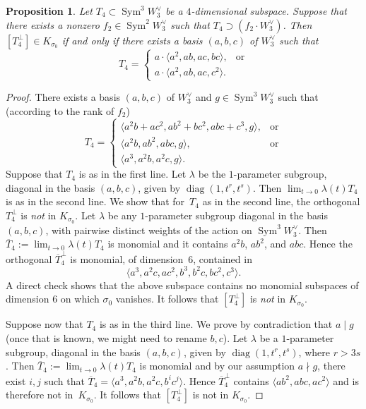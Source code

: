 \documentclass[JEP,XML,SOM,Unicode, NoEqCountersInSection,NoFloatCountersInSection]{cedram}
\newtheorem{prop}[lemm]{Proposition}
\theoremstyle{definition}
\let\la\langle
\let\ra\rangle
\let\ov\overline
\DeclareMathOperator{\Sym}{Sym}
\DeclareMathOperator{\diag}{diag}
\begin{document}
\begin{prop}\label{gary}
Let $T_4\subset \Sym^3 \!W^{\vee}_3$ be a $4$-dimensional subspace. Suppose that there exists a nonzero $f_2\in\Sym^2\! W_3^{\vee}$ such that $T_4\supset (f_2\cdot W_3^{\vee})$. Then $[T_4^{\bot}]\in K_{\sigma_0}$ if and only if there exists a basis $(a,b,c)$ of $W^{\vee}_3$ such that
\begin{equation}
T_4=
\begin{cases}
a\cdot\la a^2, ab,ac,bc\ra,& \text{or}\\
a\cdot\la a^2,ab,ac,c^2\ra.
\end{cases}
\end{equation}
\end{prop}

\begin{proof}
There exists a basis $(a,b,c)$ of $W^{\vee}_3$ and $g\in\Sym^3 \!W^{\vee}_3$ such that (according to the rank of $f_2$)
\begin{equation}
T_4=
\begin{cases}
\la a^2b +ac^2,ab^2+bc^2,abc+c^3,g\ra,& \text{or}\\
\la a^2b,ab^2,abc,g\ra,& \text{or}\\
\la a^3,a^2b,a^2c,g\ra.
\end{cases}
\end{equation}
Suppose that $T_4$ is as in the first line. Let $\lambda$ be the $1$-parameter subgroup, diagonal in the basis $(a,b,c)$, given by $\diag(1,t^r,t^s)$. Then
$\lim_{t\to 0}\lambda(t)T_4$ is as in the second line. We show that for~$T_4$ as in the second line, the orthogonal $T_4^{\bot}$ is \emph{not} in $K_{\sigma_0}$. Let $\lambda$ be any $1$-parameter subgroup
diagonal in the basis $(a,b,c)$, with pairwise distinct weights of the action on $\Sym^3 \!W^{\vee}_3$. Then $\ov{T}_4:=\lim_{t\to 0}\lambda(t)T_4$ is monomial and it contains $a^2b$, $ab^2$, and $abc$. Hence the orthogonal $ \ov{T}_4 ^{\bot}$ is monomial, of dimension~$6$, contained in
\[
\la a^3,a^2c,ac^2,b^3,b^2c,bc^2,c^3\ra.
\]
A direct check shows that the above subspace contains no monomial subspaces of dimension $6$ on which $\sigma_0$ vanishes. It follows that $[T_4^{\bot}]$ is \emph{not} in $K_{\sigma_0}$.

Suppose now that $T_4$ is as in the third line. We prove by contradiction that $a\mid g$ (once that is known, we might need to rename $b,c$).
Let $\lambda$ be a $1$-parameter subgroup, diagonal in the basis $(a,b,c)$, given by $\diag(1,t^r,t^s)$, where $r>3s$.
Then \hbox{$\ov{T}_4:=\lim_{t\to 0}\lambda(t)T_4$} is monomial and by our assumption $a\nmid g$, there exist $i,j$ such that
$\ov{T}_4=\la a^3,a^2b,a^2c,b^i c^j\ra$. Hence $ \ov{T}_4 ^{\bot}$ contains $\la ab^2,abc,ac^2\ra$ and is therefore not in~$K_{\sigma_0}$. It follows that $[T_4^{\bot}]$ is not in $K_{\sigma_0}$.
\end{proof}
\end{document}
